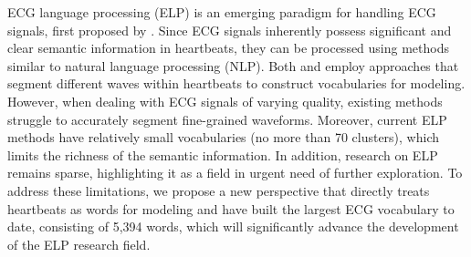 ECG language processing (ELP) is an emerging paradigm for handling ECG signals, first proposed by \citet{ECGLanguage_Mousavi_2021}. Since ECG signals inherently possess significant and clear semantic information in heartbeats, they can be processed using methods similar to natural language processing (NLP). Both \citet{ECGLanguage_Mousavi_2021} and \citet{ECGBERTUnderstanding_Choi_2023} employ approaches that segment different waves within heartbeats to construct vocabularies for modeling. However, when dealing with ECG signals of varying quality, existing methods struggle to accurately segment fine-grained waveforms. Moreover, current ELP methods have relatively small vocabularies (no more than 70 clusters), which limits the richness of the semantic information. In addition, research on ELP remains sparse, highlighting it as a field in urgent need of further exploration. To address these limitations, we propose a new perspective that directly treats heartbeats as words for modeling and have built the largest ECG vocabulary to date, consisting of 5,394 words, which will significantly advance the development of the ELP research field.